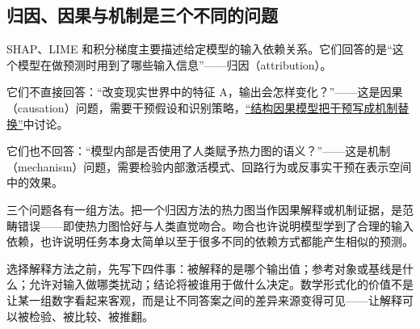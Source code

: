 \subsection{归因、因果与机制是三个不同的问题}

SHAP、LIME 和积分梯度主要描述给定模型的输入依赖关系。它们回答的是``这个模型在做预测时用到了哪些输入信息''——归因（attribution）。

它们不直接回答：``改变现实世界中的特征 A，输出会怎样变化？''——这是因果（causation）问题，需要干预假设和识别策略，\hyperref[sec:13-Machine-Learning/12-Causal-Inference/02]{``结构因果模型把干预写成机制替换''}中讨论。

它们也不回答：``模型内部是否使用了人类赋予热力图的语义？''——这是机制（mechanism）问题，需要检验内部激活模式、回路行为或反事实干预在表示空间中的效果。

三个问题各有一组方法。把一个归因方法的热力图当作因果解释或机制证据，是范畴错误——即使热力图恰好与人类直觉吻合。吻合也许说明模型学到了合理的输入依赖，也许说明任务本身太简单以至于很多不同的依赖方式都能产生相似的预测。

选择解释方法之前，先写下四件事：被解释的是哪个输出值；参考对象或基线是什么；允许对输入做哪类扰动；结论将被谁用于做什么决定。数学形式化的价值不是让某一组数字看起来客观，而是让不同答案之间的差异来源变得可见——让解释可以被检验、被比较、被推翻。
